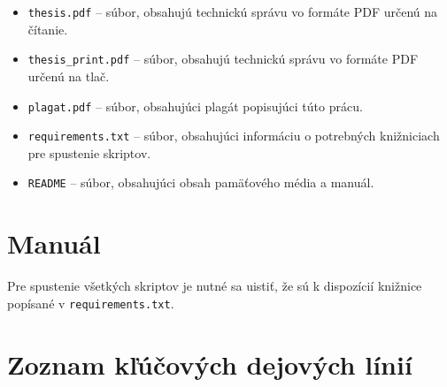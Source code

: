 \begin{itemize}
\begin{itemize}
    \end{itemize}
    \pagebreak
    \item {\tt thesis.pdf} -- súbor, obsahujú technickú správu vo formáte PDF určenú na čítanie.
    \item {\tt thesis\_print.pdf} -- súbor, obsahujú technickú správu vo formáte PDF určenú na tlač.
    \item {\tt plagat.pdf} -- súbor, obsahujúci plagát popisujúci túto prácu.
    \item {\tt requirements.txt} -- súbor, obsahujúci informáciu o potrebných knižniciach pre spustenie skriptov.
    \item {\tt README} -- súbor, obsahujúci obsah pamäťového média a manuál.
\end{itemize}

\chapter{Manuál}

Pre spustenie všetkých skriptov je nutné sa uistiť, že sú k dispozícií knižnice popísané v {\tt requirements.txt}. 


\chapter{Zoznam kľúčových dejových línií} \label{priloha-kdl}


